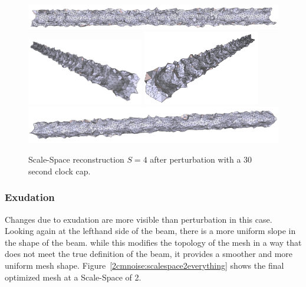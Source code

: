 \documentclass[12pt]{drexelthesis}
\let\Oldsubsubsection\subsubsection
\renewcommand{\subsubsection}{\FloatBarrier\Oldsubsubsection}
\begin{document}
\begin{figure}[!ht]
	\centering
		\includegraphics[width=5in]{simulated-lab-scan/2cmnoise/optimizedNeat/scalespace4perturb00.png}
		\includegraphics[width=2in]{simulated-lab-scan/2cmnoise/optimizedNeat/scalespace4perturb01.png}
		\includegraphics[width=2in]{simulated-lab-scan/2cmnoise/optimizedNeat/scalespace4perturb02.png}
		\includegraphics[width=5in]{simulated-lab-scan/2cmnoise/optimizedNeat/scalespace4perturb03.png}
		\caption[Scale-Space reconstruction $S = 4$ after perturbation with a 30 second clock cap]{\centering Scale-Space reconstruction $S = 4$ after perturbation with a 30 second clock cap.}
	\label{2cmnoise:scalespace4perturb}
\end{figure}




\subsubsection{Exudation}

Changes due to exudation are more visible than perturbation in this case. Looking again at the lefthand side of the beam, there is a more uniform slope in the shape of the beam. while this modifies the topology of the mesh in a way that does not meet the true definition of the beam, it provides a smoother and more uniform mesh shape. Figure~\ref{2cmnoise:scalespace2everything} shows the final optimized mesh at a Scale-Space of 2.
\end{document}
